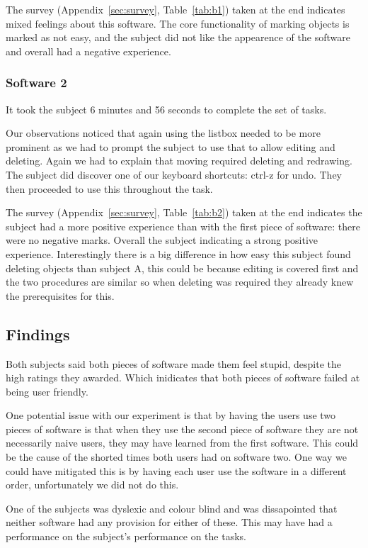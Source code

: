 \documentclass[a4paper,11pt,oneside]{article}
\begin{document}
The survey (Appendix~\ref{sec:survey}, Table~\ref{tab:b1}) taken at the end indicates mixed feelings about this software.  The core functionality of marking objects is marked as not easy, and the subject did not like the appearence of the software and overall had a negative experience.


\subsubsection{Software 2}
It took the subject 6 minutes and 56 seconds to complete the set of tasks.

Our observations noticed that again using the listbox needed to be more prominent as we had to prompt the subject to use that to allow editing and deleting.  Again we had to explain that moving required deleting and redrawing.  The subject did discover one of our keyboard shortcuts: ctrl-z for undo.  They then proceeded to use this throughout the task.

The survey (Appendix~\ref{sec:survey}, Table~\ref{tab:b2}) taken at the end indicates the subject had a more positive experience than with the first piece of software: there were no negative marks.  Overall the subject indicating a strong positive experience.  Interestingly there is a big difference in how easy this subject found deleting objects than subject A, this could be because editing is covered first and the two procedures are similar so when deleting was required they already knew the prerequisites for this.

\subsection{Findings}
Both subjects said both pieces of software made them feel stupid, despite the high ratings they awarded.  Which inidicates that both pieces of software failed at being user friendly.

One potential issue with our experiment is that by having the users use two pieces of software is that when they use the second piece of software they are not necessarily naive users, they may have learned from the first software.  This could be the cause of the shorted times both users had on software two.  One way we could have mitigated this is by having each user use the software in a different order, unfortunately we did not do this.

One of the subjects was dyslexic and colour blind and was dissapointed that neither software had any provision for either of these.  This may have had a performance on the subject's performance on the tasks.
\end{document}
